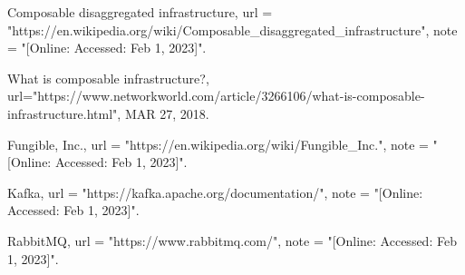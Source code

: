\documentclass[conference]{IEEEtran}
\begin{document}
\begin{thebibliography}{20}
  Composable disaggregated infrastructure,
  url = "https://en.wikipedia.org/wiki/Composable_disaggregated_infrastructure",
  note = "[Online: Accessed: Feb 1, 2023]".

  What is composable infrastructure?,
  url="https://www.networkworld.com/article/3266106/what-is-composable-infrastructure.html",
  MAR 27, 2018.

  Fungible, Inc.,
  url = "https://en.wikipedia.org/wiki/Fungible_Inc.",
  note = "[Online: Accessed: Feb 1, 2023]".
  
  Kafka,
  url = "https://kafka.apache.org/documentation/",
  note = "[Online: Accessed: Feb 1, 2023]".

  RabbitMQ,
  url = "https://www.rabbitmq.com/",
  note = "[Online: Accessed: Feb 1, 2023]".

\end{thebibliography}
\end{document}
